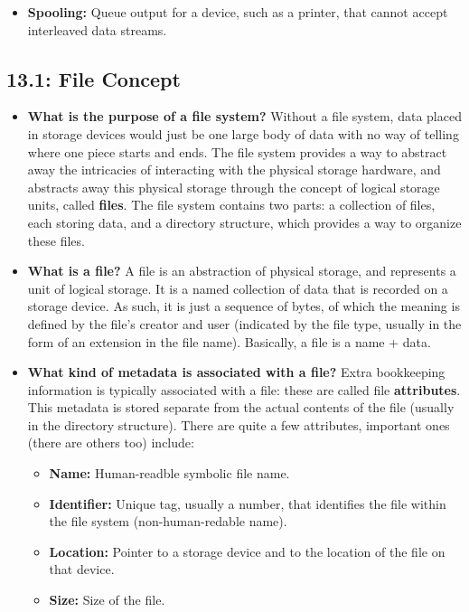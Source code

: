 \documentclass[12pt]{article}
\begin{document}
\begin{itemize}
    \item \textbf{Spooling:} Queue output for a device, such as a printer, that cannot accept interleaved data streams.
\end{itemize}

\subsection*{13.1: File Concept}

\begin{itemize}
    \item \textbf{What is the purpose of a file system?} Without a file system, data placed in storage devices would just be one large body of data with no way of telling where one piece starts and ends. The file system provides a way to abstract away the intricacies of interacting with the physical storage hardware, and abstracts away this physical storage through the concept of logical storage units, called \textbf{files}. The file system contains two parts: a collection of files, each storing data, and a directory structure, which provides a way to organize these files.
    \item \textbf{What is a file?} A file is an abstraction of physical storage, and represents a unit of logical storage. It is a named collection of data that is recorded on a storage device. As such, it is just a sequence of bytes, of which the meaning is defined by the file's creator and user (indicated by the file type, usually in the form of an extension in the file name). Basically, a file is a name + data.
    \item \textbf{What kind of metadata is associated with a file?} Extra bookkeeping information is typically associated with a file: these are called file \textbf{attributes}. This metadata is stored separate from the actual contents of the file (usually in the directory structure). There are quite a few attributes, important ones (there are others too) include:
        \begin{itemize}
            \item \textbf{Name:} Human-readble symbolic file name.
            \item \textbf{Identifier:} Unique tag, usually a number, that identifies the file within the file system (non-human-redable name).
            \item \textbf{Location:} Pointer to a storage device and to the location of the file on that device.
            \item \textbf{Size:} Size of the file.

\end{itemize}
\end{itemize}
\end{document}
